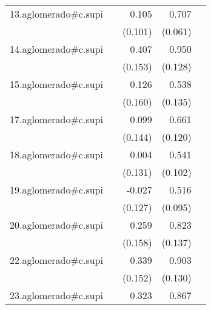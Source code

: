 {\begin{longtable}{l*{4}{D{.}{.}{-1}}}
\addlinespace
13.aglomerado#c.supi&                     &       0.105         &       0.707\sym{***}&                     \\
            &                     &     (0.101)         &     (0.061)         &                     \\
\addlinespace
14.aglomerado#c.supi&                     &       0.407\sym{**} &       0.950\sym{***}&                     \\
            &                     &     (0.153)         &     (0.128)         &                     \\
\addlinespace
15.aglomerado#c.supi&                     &       0.126         &       0.538\sym{***}&                     \\
            &                     &     (0.160)         &     (0.135)         &                     \\
\addlinespace
17.aglomerado#c.supi&                     &       0.099         &       0.661\sym{***}&                     \\
            &                     &     (0.144)         &     (0.120)         &                     \\
\addlinespace
18.aglomerado#c.supi&                     &       0.004         &       0.541\sym{***}&                     \\
            &                     &     (0.131)         &     (0.102)         &                     \\
\addlinespace
19.aglomerado#c.supi&                     &      -0.027         &       0.516\sym{***}&                     \\
            &                     &     (0.127)         &     (0.095)         &                     \\
\addlinespace
20.aglomerado#c.supi&                     &       0.259         &       0.823\sym{***}&                     \\
            &                     &     (0.158)         &     (0.137)         &                     \\
\addlinespace
22.aglomerado#c.supi&                     &       0.339\sym{*}  &       0.903\sym{***}&                     \\
            &                     &     (0.152)         &     (0.130)         &                     \\
\addlinespace
23.aglomerado#c.supi&                     &       0.323\sym{**} &       0.867\sym{***}&                     \\

\end{longtable}}
